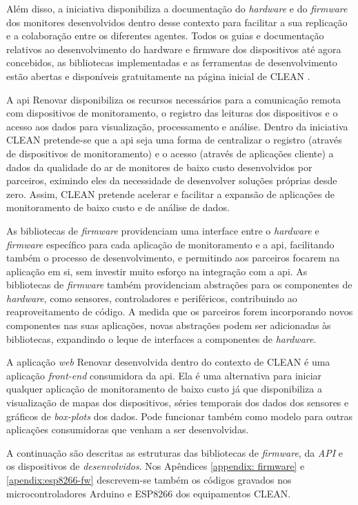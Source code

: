 Além disso, a iniciativa disponibiliza a documentação do \textit{hardware} e do \textit{firmware} dos monitores desenvolvidos dentro desse contexto para facilitar a sua replicação e a colaboração entre os diferentes agentes. Todos os guias e documentação relativos ao desenvolvimento do hardware e firmware dos dispositivos até agora concebidos, as bibliotecas implementadas e as ferramentas de desenvolvimento estão abertas e disponíveis gratuitamente na página inicial de CLEAN \cite{Campo2021}.

A \acrshort{api} Renovar disponibiliza os recursos necessários para a comunicação remota com dispositivos de monitoramento, o registro das leituras dos dispositivos e o acesso aos dados para visualização, processamento e análise. Dentro da iniciativa CLEAN pretende-se que a \acrshort{api} seja uma forma de centralizar o registro (através de dispositivos de monitoramento) e o acesso (através de aplicações cliente) a dados da qualidade do ar de monitores de baixo custo desenvolvidos por parceiros, eximindo eles da necessidade de desenvolver soluções próprias desde zero. Assim, CLEAN pretende acelerar e facilitar a expansão de aplicações de monitoramento de baixo custo e de análise de dados. 

As bibliotecas de \textit{firmware} providenciam uma interface entre o \textit{hardware} e \textit{firmware} específico para cada aplicação de monitoramento e a \acrshort{api}, facilitando também o processo de desenvolvimento, e permitindo aos parceiros focarem na aplicação em si, sem investir muito esforço na integração com a \acrshort{api}. As bibliotecas de \textit{firmware} também providenciam abstrações para os componentes de \textit{hardware}, como sensores, controladores e periféricos, contribuindo ao reaproveitamento de código. A medida que os parceiros forem incorporando novos componentes nas suas aplicações, novas abstrações podem ser adicionadas às bibliotecas, expandindo o leque de interfaces a componentes de \textit{hardware}.

A aplicação \textit{web} Renovar desenvolvida dentro do contexto de CLEAN é uma aplicação \textit{front-end} consumidora da \acrshort{api}. Ela é uma alternativa para iniciar qualquer aplicação de monitoramento de baixo custo já que disponibiliza a visualização de mapas dos dispositivos, séries temporais dos dados dos sensores e gráficos de \textit{box-plots} dos dados. Pode funcionar também como modelo para outras aplicações consumidoras que venham a ser desenvolvidas.

A continuação são descritas as estruturas das bibliotecas de \textit{firmware}, da \textit{API} e os dispositivos de \textit{desenvolvidos}. Nos Apêndices \ref{appendix: firmware} e \ref{apendix:esp8266-fw} descrevem-se também os códigos gravados nos microcontroladores Arduino e ESP8266 dos equipamentos CLEAN.

